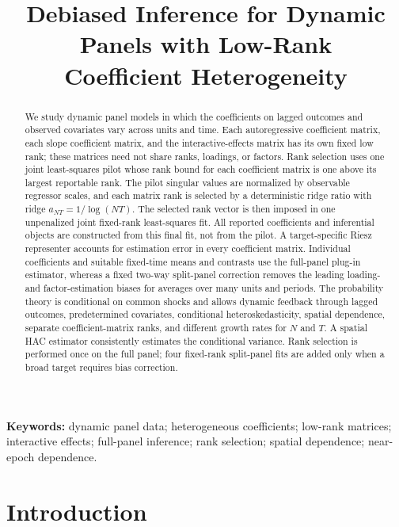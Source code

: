 \documentclass[11pt]{article}
\numberwithin{equation}{section}
\theoremstyle{remark}
\begin{document}
\title{Debiased Inference for Dynamic Panels with
Low-Rank \\ Coefficient Heterogeneity}
\author{}
\date{}
\maketitle

\begin{abstract}
We study dynamic panel models in which the coefficients on lagged outcomes and observed covariates vary across units and time. Each autoregressive coefficient matrix, each slope coefficient matrix, and the interactive-effects matrix has its own fixed low rank; these matrices need not share ranks, loadings, or factors. Rank selection uses one joint least-squares pilot whose rank bound for each coefficient matrix is one above its largest reportable rank. The pilot singular values are normalized by observable regressor scales, and each matrix rank is selected by a deterministic ridge ratio with ridge $a_{NT}=1/\log(NT)$. The selected rank vector is then imposed in one unpenalized joint fixed-rank least-squares fit. All reported coefficients and inferential objects are constructed from this final fit, not from the pilot. A target-specific Riesz representer accounts for estimation error in every coefficient matrix. Individual coefficients and suitable fixed-time means and contrasts use the full-panel plug-in estimator, whereas a fixed two-way split-panel correction removes the leading loading- and factor-estimation biases for averages over many units and periods. The probability theory is conditional on common shocks and allows dynamic feedback through lagged outcomes, predetermined covariates, conditional heteroskedasticity, spatial dependence, separate coefficient-matrix ranks, and different growth rates for $N$ and $T$. A spatial HAC estimator consistently estimates the conditional variance. Rank selection is performed once on the full panel; four fixed-rank split-panel fits are added only when a broad target requires bias correction.
\end{abstract}

\noindent\textbf{Keywords:} dynamic panel data; heterogeneous coefficients; low-rank matrices; interactive effects; full-panel inference; rank selection; spatial dependence; near-epoch dependence.

\clearpage
\tableofcontents
\clearpage

\section{Introduction}
\label{sec:introduction}
\end{document}
